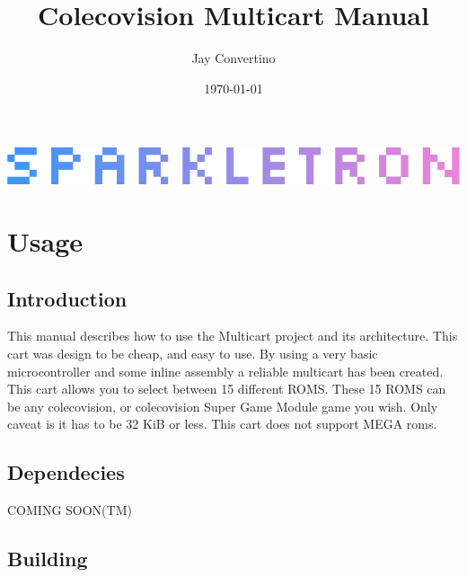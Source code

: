 \documentclass{article}
\title{{\Huge Colecovision Multicart Manual}}
\author{\Large Jay Convertino}
\date{\today}
\begin{document}
  \begin{titlepage}
    \begin{center}

    \thetitle

    \vspace{25mm}

    \includegraphics[width=\textwidth,height=\textheight,keepaspectratio]{src/img/SPARKLETRON.png}

    \vspace{25mm}

    \thedate

    \vspace{15mm}

    \theauthor

    \end{center}
  \end{titlepage}

  \tableofcontents

  \newpage

  \section{Usage}

  \subsection{Introduction}

  \par
  This manual describes how to use the Multicart project and its architecture. This cart was design to be cheap, and easy to use.
  By using a very basic microcontroller and some inline assembly a reliable multicart has been created. This cart allows you to
  select between 15 different ROMS. These 15 ROMS can be any colecovision, or colecovision Super Game Module game you wish. Only
  caveat is it has to be 32 KiB or less. This cart does not support MEGA roms.

  \subsection{Dependecies}

  \par
  COMING SOON(TM)

  \subsection{Building}
\end{document}
